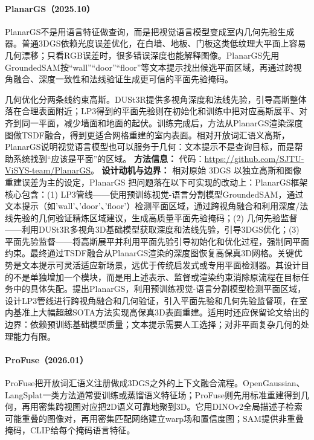 \paragraph{PlanarGS（2025.10）\cite{2510_23930}}
PlanarGS不是用语言特征做查询，而是把视觉语言模型变成室内几何先验生成器。普通3DGS依赖光度误差优化，在白墙、地板、门板这类低纹理大平面上容易几何漂移；只看RGB误差时，很多错误深度也能解释图像。PlanarGS先用GroundedSAM按“wall”“door”“floor”等文本提示找出候选平面区域，再通过跨视角融合、深度一致性和法线验证生成更可信的平面先验掩码。

几何优化分两条线约束高斯。DUSt3R提供多视角深度和法线先验，引导高斯整体落在合理表面附近；LP3得到的平面先验则在初始化和训练中把对应高斯展平、对齐到同一平面，减少墙面和地面的起伏。训练完成后，方法从PlanarGS渲染深度图做TSDF融合，得到更适合网格重建的室内表面。相对开放词汇语义高斯，PlanarGS说明视觉语言模型也可以服务于几何：文本提示不是查询目标，而是帮助系统找到“应该是平面”的区域。
\textbf{方法信息：} 代码：\url{https://github.com/SJTU-ViSYS-team/PlanarGS}。
\textbf{设计动机与边界：} 相对原始 3DGS 以独立高斯和图像重建误差为主的设定，PlanarGS 把问题落在以下可实现的改动上：PlanarGS框架核心包含：(1) LP3管线——使用预训练视觉-语言分割模型GroundedSAM，通过文本提示（如'wall'、'door'、'floor'）检测平面区域，通过跨视角融合和利用深度/法线先验的几何验证精炼区域建议，生成高质量平面先验掩码；(2) 几何先验监督——利用DUSt3R多视角3D基础模型获取深度和法线先验，引导3DGS优化；(3) 平面先验监督——将高斯展平并利用平面先验引导初始化和优化过程，强制同平面约束。最终通过TSDF融合从PlanarGS渲染的深度图恢复高保真3D网格。关键优势是文本提示可灵活适应新场景，远优于传统启发式或专用平面检测器。其设计目的不是单独增加一个模块，而是用上述表示、监督或渲染约束消除原流程在目标任务中的具体失配。提出PlanarGS，利用预训练视觉-语言分割模型检测平面区域，设计LP3管线进行跨视角融合和几何验证，引入平面先验和几何先验监督项，在室内基准上大幅超越SOTA方法实现高保真3D表面重建。适用时还应保留论文给出的边界：依赖预训练基础模型质量；文本提示需要人工选择；对非平面复杂几何的处理能力有限。
\paragraph{ProFuse（2026.01）\cite{2601_04754}}
ProFuse把开放词汇语义注册做成3DGS之外的上下文融合流程。OpenGaussian、LangSplat一类方法通常要训练或蒸馏语义特征场；ProFuse则先用标准重建得到几何，再用密集跨视图对应把2D语义可靠地聚到3D。它用DINOv2全局描述子检索可能重叠的图像对，再用密集匹配网络建立warp场和置信度图；SAM提供非重叠掩码，CLIP给每个掩码语言特征。

